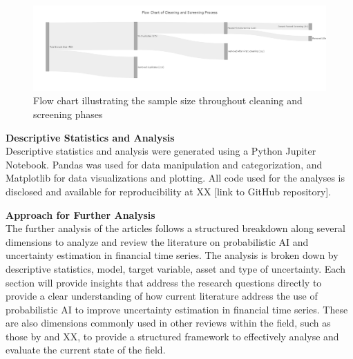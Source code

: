   \begin{figure}[H]
      \centering
      \includegraphics[width=1\linewidth]{Images/screening_funnel.png}
      \caption{Flow chart illustrating the sample size throughout cleaning and screening phases}
      \label{fig:screening_and_cleaning_funnel}
  \end{figure}


\textbf{Descriptive Statistics and Analysis}\\
Descriptive statistics and analysis were generated using a Python Jupiter Notebook. Pandas was used for data manipulation and categorization, and Matplotlib for data visualizations and plotting. All code used for the analyses is disclosed and available for reproducibility at XX [link to GitHub repository]. 

\textbf{Approach for Further Analysis}\\
The further analysis of the articles follows a structured breakdown along several dimensions to analyze and review the literature on probabilistic AI and uncertainty estimation in financial time series. The analysis is broken down by descriptive statistics, model, target variable, asset and type of uncertainty. Each section will provide insights that address the research questions directly to provide a clear understanding of how current literature address the use of probabilistic AI to improve uncertainty estimation in financial time series. These are also dimensions commonly used in other reviews within the field, such as those by \textcite{Blasco_et_al_2024} and XX, to provide a structured framework to effectively analyse and evaluate the current state of the field. 

